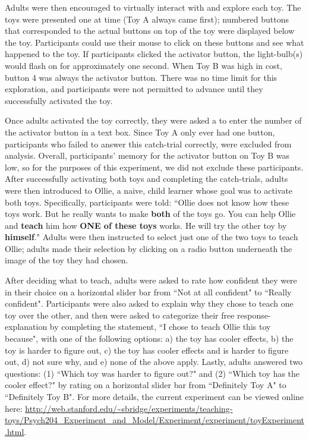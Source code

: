 \documentclass[10pt,letterpaper]{article}
\begin{document}
Adults were then encouraged to virtually interact with and explore each toy. The toys were presented one at time (Toy A always came first); numbered buttons that corresponded to the actual buttons on top of the toy were displayed below the toy. Participants could use their mouse to click on these buttons and see what happened to the toy. If participants clicked the activator button, the light-bulb(s) would flash on for approximately one second. When Toy B was high in cost, button 4 was always the activator button. There was no time limit for this exploration, and participants were not permitted to advance until they successfully activated the toy. 

Once adults activated the toy correctly, they were asked a to enter the number of the activator button in a text box. Since Toy A only ever had one button, participants who failed to answer this catch-trial correctly, were excluded from analysis. Overall, participants' memory for the activator button on Toy B was low, so for the purposes of this experiment, we did not exclude these participants. After successfully activating both toys and completing the catch-trials, adults were then introduced to Ollie, a naive, child learner whose goal was to activate both toys. Specifically, participants were told: ``Ollie does not know how these toys work. But he really wants to make \textbf{both} of the toys go. You can help Ollie and \textbf{teach} him how \textbf{ONE of these toys} works. He will try the other toy by \textbf{himself}." Adults were then instructed to select just one of the two toys to teach Ollie; adults made their selection by clicking on a radio button underneath the image of the toy they had chosen. 

After deciding what to teach, adults were asked to rate how confident they were in their choice on a horizontal slider bar from ``Not at all confident" to ``Really confident". Participants were also asked to explain why they chose to teach one toy over the other, and then were asked to categorize their free response-explanation by completing the statement, ``I chose to teach Ollie this toy because", with one of the following options: a) the toy has cooler effects, b) the toy is harder to figure out, c) the toy has cooler effects and is harder to figure out, d) not sure why, and e) none of the above apply. Lastly, adults answered two questions: (1) ``Which toy was harder to figure out?" and (2) ``Which toy has the cooler effect?" by rating on a horizontal slider bar from ``Definitely Toy A" to ``Definitely Toy B". For more details, the current experiment can be viewed online here:  \url{http://web.stanford.edu/~sbridge/experiments/teaching-toys/Psych204_Experiment_and_Model/Experiment/experiment/toyExperiment.html}.
\end{document}
